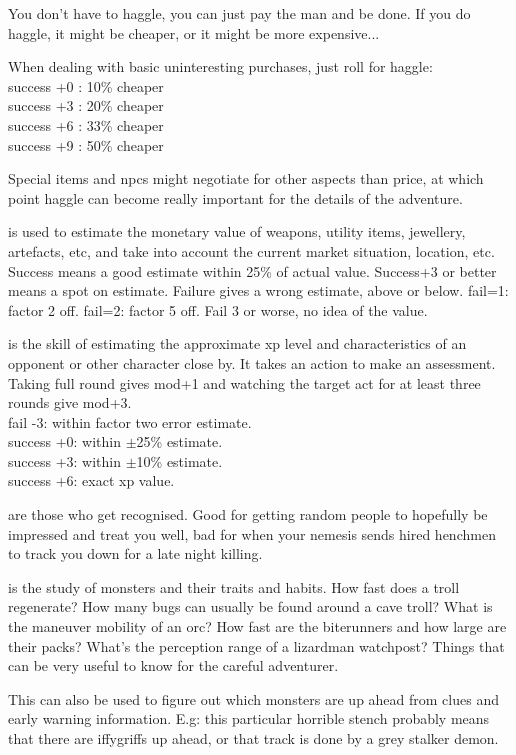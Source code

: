 You don't have to haggle, you can just pay the man and be done. If you do haggle, it might be cheaper, or it might be more expensive...

When dealing with basic uninteresting purchases, just roll for haggle: \\
success +0 : 10\% cheaper \\
success +3 : 20\% cheaper \\
success +6 : 33\% cheaper \\
success +9 : 50\% cheaper

Special items and npcs might negotiate for other aspects than price, at which point haggle can become really important for the details of the adventure.


 is used to estimate the monetary value of weapons, utility items, jewellery, artefacts, etc, and take into account the current market situation, location, etc.
Success means a good estimate within 25\% of actual value. Success+3 or better means a spot on estimate. Failure gives a wrong estimate, above or below. fail=1: factor 2 off. fail=2: factor 5 off. Fail 3 or worse, no idea of the value.


 is the skill of estimating the approximate xp level and characteristics of an opponent or other character close by. It takes an action to make an assessment. Taking full round gives mod+1 and watching the target act for at least three rounds give mod+3. \\
fail -3: within factor two error estimate. \\
success +0: within $\pm$25\% estimate. \\
success +3: within $\pm$10\% estimate. \\
success +6: exact xp value.


 are those who get recognised. Good for getting random people to hopefully be impressed and treat you well, bad for when your nemesis sends hired henchmen to track you down for a late night killing.


 is the study of monsters and their traits and habits. How fast does a troll regenerate? How many bugs can usually be found around a cave troll? What is the maneuver mobility of an orc? How fast are the biterunners and how large are their packs? What's the perception range of a lizardman watchpost? Things that can be very useful to know for the careful adventurer.

This can also be used to figure out which monsters are up ahead from clues and early warning information. E.g: this particular horrible stench probably means that there are iffygriffs up ahead, or that track is done by a grey stalker demon.


